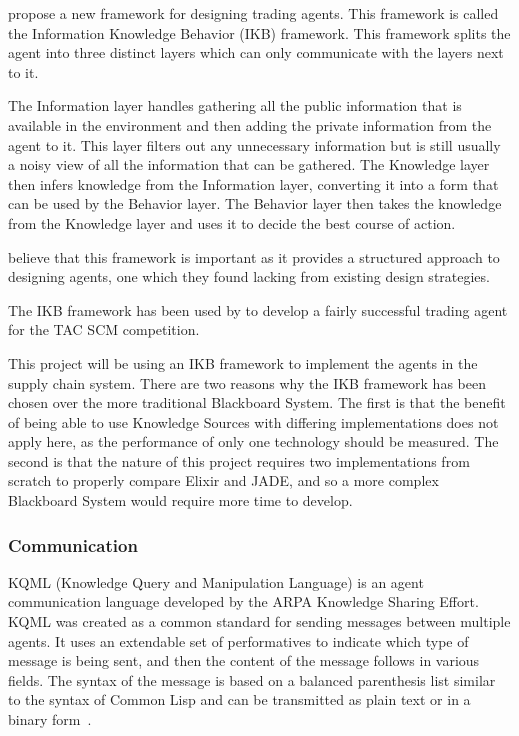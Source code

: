  propose a new framework for designing trading agents.
This framework is called the Information Knowledge Behavior (IKB) framework.
This framework splits the agent into three distinct layers which can only communicate with the layers next to it.

The Information layer handles gathering all the public information that is available in the environment and then adding the private information from the agent to it.
This layer filters out any unnecessary information but is still usually a noisy view of all the information that can be gathered.
The Knowledge layer then infers knowledge from the Information layer, converting it into a form that can be used by the Behavior layer.
The Behavior layer then takes the knowledge from the Knowledge layer and uses it to decide the best course of action.

 believe that this framework is important as it provides a structured approach to designing agents, one which they found lacking from existing design strategies.

The IKB framework has been used by  to develop a fairly successful trading agent for the TAC SCM competition.

This project will be using an IKB framework to implement the agents in the supply chain system.
There are two reasons why the IKB framework has been chosen over the more traditional Blackboard System.
The first is that the benefit of being able to use Knowledge Sources with differing implementations does not apply here, as the performance of only one technology should be measured.
The second is that the nature of this project requires two implementations from scratch to properly compare Elixir and JADE, and so a more complex Blackboard System would require more time to develop.

\subsubsection{Communication}

KQML (Knowledge Query and Manipulation Language) is an agent communication language developed by the ARPA Knowledge Sharing Effort.
KQML was created as a common standard for sending messages between multiple agents.
It uses an extendable set of performatives to indicate which type of message is being sent, and then the content of the message follows in various fields.
The syntax of the message is based on a balanced parenthesis list similar to the syntax of Common Lisp and can be transmitted as plain text or in a binary form~\cite{finin1994kqml}.

